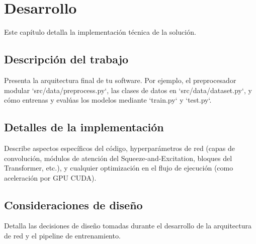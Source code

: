 
\chapter{Desarrollo}
\label{chap:desarrollo}

Este capítulo detalla la implementación técnica de la solución.

\section{Descripción del trabajo}
\label{sec:descripcion_trabajo}
Presenta la arquitectura final de tu software. Por ejemplo, el preprocesador modular `src/data/preprocess.py`, las clases de datos en `src/data/dataset.py`, y cómo entrenas y evalúas los modelos mediante `train.py` y `test.py`.

\section{Detalles de la implementación}
\label{sec:detalles_implementacion}
Describe aspectos específicos del código, hyperparámetros de red (capas de convolución, módulos de atención del Squeeze-and-Excitation, bloques del Transformer, etc.), y cualquier optimización en el flujo de ejecución (como aceleración por GPU CUDA).

\section{Consideraciones de diseño}
\label{sec:consideraciones_diseno}
Detalla las decisiones de diseño tomadas durante el desarrollo de la arquitectura de red y el pipeline de entrenamiento.
